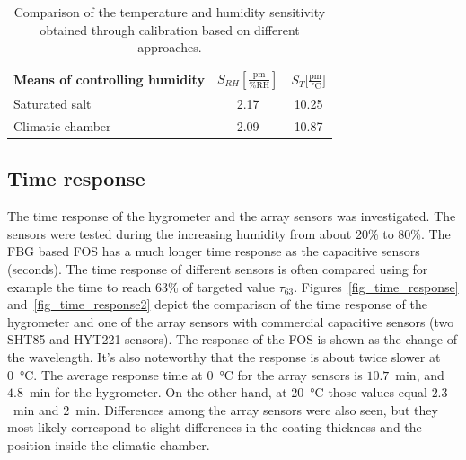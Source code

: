 \begin{table}[!h]
\centering
\caption{Comparison of the temperature and humidity sensitivity obtained through calibration based on different approaches.}
\label{tab:fos}
\begin{tabular}{lcc}
Means of controlling humidity & $S_{RH} \mathrm{[\frac{pm}{\%RH}]}$ & $S_{T}\mathrm{[\frac{pm}{\SI{}{\celsius}}}]$  \\ \hline
Saturated salt                & 2.17     & 10.25   \\
Climatic chamber              & 2.09     & 10.87  
\end{tabular}%
\end{table}


\subsection{Time response}

The time response of the hygrometer and the array sensors was investigated. The sensors were tested during the increasing humidity from about 20\% to 80\%. The \gls{FBG} based \gls{FOS} has a much longer time response as the capacitive sensors (seconds). The time response of different sensors is often compared using for example the time to reach 63\% of targeted value $\tau_{63}$.
\newpage
Figures~\ref{fig_time_response} and~\ref{fig_time_response2} depict the comparison of the time response of the hygrometer and one of the array sensors with commercial capacitive sensors (two SHT85 and HYT221 sensors). The response of the \gls{FOS} is shown as the change of the wavelength. It's also noteworthy that the response is about twice slower at \SI{0}{\celsius}. The average response time at \SI{0}{\celsius} for the array sensors is $10.7$~min, and $4.8$~min for the hygrometer. On the other hand, at \SI{20}{\celsius} those values equal $2.3$~min and $2$~min. Differences among the array sensors were also seen, but they most likely correspond to slight differences in the coating thickness and the position inside the climatic chamber. 


